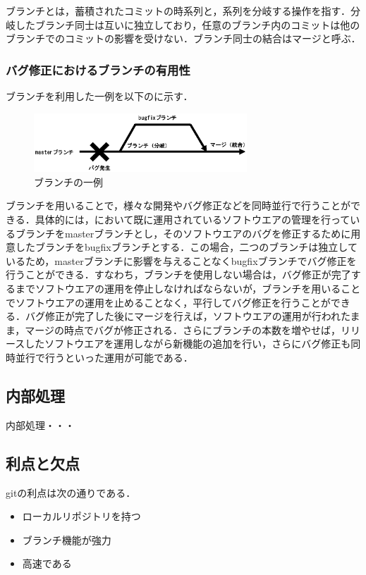 \documentclass[a4paper,9pt,twocolumn]{jsarticle}
\begin{document}
ブランチとは，蓄積されたコミットの時系列と，系列を分岐する操作を指す．分岐したブランチ同士は互いに独立しており，任意のブランチ内のコミットは他のブランチでのコミットの影響を受けない．ブランチ同士の結合はマージと呼ぶ．

\subsubsection{バグ修正におけるブランチの有用性}
ブランチを利用した一例を以下のに示す．

\begin{figure}[h]
\centering
\includegraphics[width=80mm]{img/branch.eps}
\caption{ブランチの一例}
\label{branch_ex}
\end{figure}

ブランチを用いることで，様々な開発やバグ修正などを同時並行で行うことができる．具体的には，において既に運用されているソフトウエアの管理を行っているブランチをmasterブランチとし，そのソフトウエアのバグを修正するために用意したブランチをbugfixブランチとする．この場合，二つのブランチは独立しているため，masterブランチに影響を与えることなくbugfixブランチでバグ修正を行うことができる．すなわち，ブランチを使用しない場合は，バグ修正が完了するまでソフトウエアの運用を停止しなければならないが，ブランチを用いることでソフトウエアの運用を止めることなく，平行してバグ修正を行うことができる．バグ修正が完了した後にマージを行えば，ソフトウエアの運用が行われたまま，マージの時点でバグが修正される．さらにブランチの本数を増やせば，リリースしたソフトウエアを運用しながら新機能の追加を行い，さらにバグ修正も同時並行で行うといった運用が可能である．


\subsection{内部処理}
内部処理・・・

\subsection{利点と欠点}
gitの利点は次の通りである．

\begin{itemize}
\item ローカルリポジトリを持つ
\item ブランチ機能が強力
\item 高速である
\end{itemize}
\end{document}
